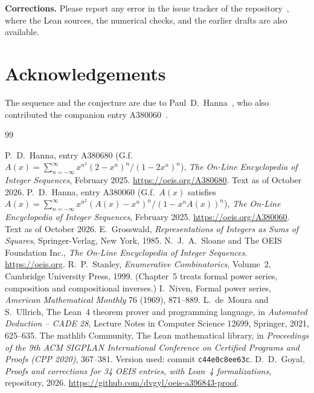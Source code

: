 \documentclass[11pt,a4paper]{article}
\theoremstyle{definition}
\theoremstyle{remark}
\newcommand{\para}[1]{\par\medskip\noindent\textbf{#1}\enspace}
\begin{document}
\para{Corrections.} Please report any error in the issue tracker of the repository~\cite{repo}, where the Lean
sources, the numerical checks, and the earlier drafts are also available.

\section*{Acknowledgements}
The sequence and the conjecture are due to Paul~D.~Hanna~\cite{oeis}, who also contributed the companion entry
A380060~\cite{oeisother}.

\begin{thebibliography}{99}\small
\raggedright
{} P.~D.~Hanna, entry A380680 (G.f.\ $A(x)=\sum_{n=-\infty}^{\infty}x^{n^2}(2-x^n)^n/(1-2x^n)^n$), \emph{The On-Line Encyclopedia of Integer Sequences}, February 2025. \url{https://oeis.org/A380680}. Text as of October 2026.
 P.~D.~Hanna, entry A380060 (G.f.\ $A(x)$ satisfies $A(x)=\sum_{n=-\infty}^{\infty}x^{n^2}(A(x)-x^n)^n/(1-x^nA(x))^n$), \emph{The On-Line Encyclopedia of Integer Sequences}, February 2025. \url{https://oeis.org/A380060}. Text as of October 2026.
 E.~Grosswald, \emph{Representations of Integers as Sums of Squares}, Springer-Verlag, New York, 1985.
 N.~J.~A.~Sloane and The OEIS Foundation Inc., \emph{The On-Line Encyclopedia of Integer Sequences}. \url{https://oeis.org}.
 R.~P.~Stanley, \emph{Enumerative Combinatorics}, Volume~2, Cambridge University Press, 1999. (Chapter~5 treats formal power series, composition and compositional inverses.)
 I.~Niven, Formal power series, \emph{American Mathematical Monthly} 76 (1969), 871--889.
 L.~de~Moura and S.~Ullrich, The Lean~4 theorem prover and programming language, in \emph{Automated Deduction -- CADE 28}, Lecture Notes in Computer Science 12699, Springer, 2021, 625--635.
 The mathlib Community, The Lean mathematical library, in \emph{Proceedings of the 9th ACM SIGPLAN International Conference on Certified Programs and Proofs (CPP 2020)}, 367--381. Version used: commit \texttt{c44e0c8ee63c}.
 D.~D.~Goyal, \emph{Proofs and corrections for 34 OEIS entries, with Lean~4 formalizations}, repository, 2026. \url{https://github.com/dvgyl/oeis-a396843-proof}.
\end{thebibliography}
\end{document}
